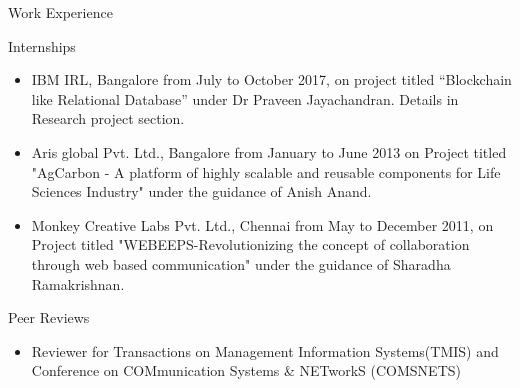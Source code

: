 \documentclass{resume} %
\begin{document}
\begin{rSection}{Work Experience}

\end{rSection}





\begin{rSection}{Internships}
\begin{itemize}
\item IBM IRL, Bangalore from July to October 2017, on project titled “Blockchain like
Relational Database” under Dr Praveen Jayachandran. Details in Research project section.
\item Aris global Pvt. Ltd., Bangalore from January to June 2013 on Project titled "AgCarbon - A platform of highly scalable and reusable components for Life Sciences Industry" under the guidance of Anish Anand.
\item Monkey Creative Labs Pvt. Ltd., Chennai from May to December 2011, on Project titled "WEBEEPS-Revolutionizing the concept of collaboration through web based communication" under the guidance of Sharadha Ramakrishnan.
\end{itemize}
\end{rSection}


\begin{rSection}{Peer Reviews}
\begin{itemize}
\item Reviewer for Transactions on Management Information Systems(TMIS) and Conference on COMmunication Systems & NETworkS (COMSNETS)
\end{itemize}
\end{rSection}
\end{document}
